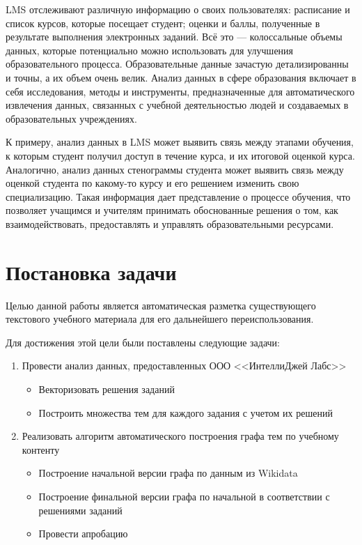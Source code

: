 \documentclass[14pt]{matmex-diploma-custom}
\begin{document}
LMS отслеживают различную информацию о своих пользователях:  расписание и список курсов, которые посещает студент; оценки и баллы, полученные в результате выполнения электронных заданий. Всё это --- колоссальные объемы данных, которые потенциально можно использовать для улучшения образовательного процесса. Образовательные данные зачастую детализированны и точны, а их объем очень велик. Анализ данных в сфере образования включает в себя исследования, методы и инструменты, предназначенные для автоматического извлечения данных, связанных с учебной деятельностью людей и создаваемых в образовательных учреждениях.

К примеру, анализ данных в LMS может выявить связь между этапами обучения, к которым студент получил доступ в течение курса, и их итоговой оценкой курса. Аналогично, анализ данных стенограммы студента может выявить связь между оценкой студента по какому-то курсу и его решением изменить свою специализацию. Такая информация дает представление о процессе обучения, что позволяет учащимся и учителям принимать обоснованные решения о том, как взаимодействовать, предоставлять и управлять образовательными ресурсами.

\section{Постановка задачи}
Целью данной работы является автоматическая разметка существующего текстового учебного материала для его дальнейшего переиспользования.

Для достижения этой цели были поставлены следующие задачи: 

\begin{enumerate}
    \item Провести анализ данных, предоставленных ООО <<ИнтеллиДжей Лабс>>~\cite{jetbrains}
    \begin{itemize}
        \item Векторизовать решения заданий
        \item Построить множества тем для каждого задания с учетом их решений
    \end{itemize}
    \item Реализовать алгоритм автоматического построения графа тем по учебному контенту~\cite{themegraph}
    \begin{itemize}
        \item Построение начальной версии графа по данным из Wikidata
        \item Построение финальной версии графа по начальной в соответствии с решениями заданий
    \item Провести апробацию
    \end{itemize}
\end{enumerate}
\end{document}
